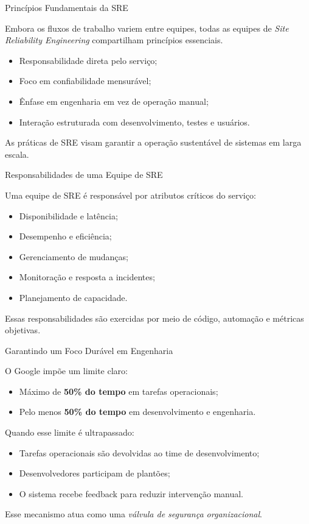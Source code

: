 \documentclass[9pt]{beamer}
\begin{document}
\begin{frame}{Princípios Fundamentais da SRE}

Embora os fluxos de trabalho variem entre equipes, todas as equipes de
\textit{Site Reliability Engineering} compartilham princípios essenciais.

\begin{itemize}
    \item Responsabilidade direta pelo serviço;
    \item Foco em confiabilidade mensurável;
    \item Ênfase em engenharia em vez de operação manual;
    \item Interação estruturada com desenvolvimento, testes e usuários.
\end{itemize}

As práticas de SRE visam garantir a operação sustentável de sistemas em
larga escala.

\end{frame}
\begin{frame}{Responsabilidades de uma Equipe de SRE}

Uma equipe de SRE é responsável por atributos críticos do serviço:

\begin{itemize}
    \item Disponibilidade e latência;
    \item Desempenho e eficiência;
    \item Gerenciamento de mudanças;
    \item Monitoração e resposta a incidentes;
    \item Planejamento de capacidade.
\end{itemize}

Essas responsabilidades são exercidas por meio de código, automação
e métricas objetivas.

\end{frame}
\begin{frame}{Garantindo um Foco Durável em Engenharia}

O Google impõe um limite claro:
\begin{itemize}
    \item Máximo de \textbf{50\% do tempo} em tarefas operacionais;
    \item Pelo menos \textbf{50\% do tempo} em desenvolvimento e engenharia.
\end{itemize}

Quando esse limite é ultrapassado:
\begin{itemize}
    \item Tarefas operacionais são devolvidas ao time de desenvolvimento;
    \item Desenvolvedores participam de plantões;
    \item O sistema recebe feedback para reduzir intervenção manual.
\end{itemize}

Esse mecanismo atua como uma \textit{válvula de segurança organizacional}.

\end{frame}
\end{document}
